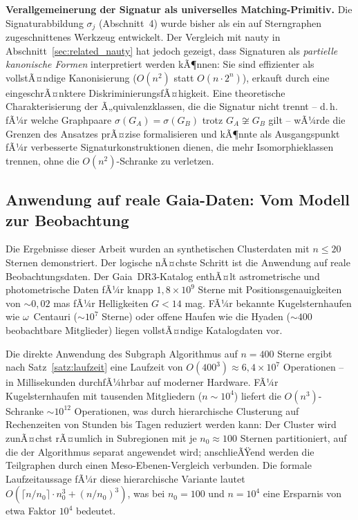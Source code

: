 ﻿\documentclass[a4paper,12pt]{report}
\theoremstyle{definition}
\begin{document}
\textbf{Verallgemeinerung der Signatur als universelles Matching-Primitiv.} Die Signaturabbildung $\sigma_j$ (Abschnitt~4) wurde bisher als ein auf Sterngraphen zugeschnittenes Werkzeug entwickelt. Der Vergleich mit nauty in Abschnitt~\ref{sec:related_nauty} hat jedoch gezeigt, dass Signaturen als \emph{partielle kanonische Formen} interpretiert werden kÃ¶nnen: Sie sind effizienter als vollstÃ¤ndige Kanonisierung ($O(n^2)$ statt $O(n \cdot 2^n)$), erkauft durch eine eingeschrÃ¤nktere DiskriminierungsfÃ¤higkeit. Eine theoretische Charakterisierung der Ã„quivalenzklassen, die die Signatur nicht trennt -- d.\,h. fÃ¼r welche Graphpaare $\sigma(G_A) = \sigma(G_B)$ trotz $G_A \not\cong G_B$ gilt -- wÃ¼rde die Grenzen des Ansatzes prÃ¤zise formalisieren und kÃ¶nnte als Ausgangspunkt fÃ¼r verbesserte Signaturkonstruktionen dienen, die mehr Isomorphieklassen trennen, ohne die $O(n^2)$-Schranke zu verletzen.

\subsection{Anwendung auf reale Gaia-Daten: Vom Modell zur Beobachtung}

Die Ergebnisse dieser Arbeit wurden an synthetischen Clusterdaten mit $n \leq 20$ Sternen demonstriert. Der logische nÃ¤chste Schritt ist die Anwendung auf reale Beobachtungsdaten. Der Gaia~DR3-Katalog \cite{gaia2022} enthÃ¤lt astrometrische und photometrische Daten fÃ¼r knapp $1{,}8 \times 10^9$ Sterne mit Positionsgenauigkeiten von $\sim 0{,}02$ mas fÃ¼r Helligkeiten $G < 14$ mag. FÃ¼r bekannte Kugelsternhaufen wie $\omega$~Centauri ($\sim 10^7$ Sterne) oder offene Haufen wie die Hyaden ($\sim 400$ beobachtbare Mitglieder) liegen vollstÃ¤ndige Katalogdaten vor.

Die direkte Anwendung des Subgraph Algorithmus auf $n = 400$ Sterne ergibt nach Satz~\ref{satz:laufzeit} eine Laufzeit von $O(400^3) \approx 6{,}4 \times 10^7$ Operationen -- in Millisekunden durchfÃ¼hrbar auf moderner Hardware. FÃ¼r Kugelsternhaufen mit tausenden Mitgliedern ($n \sim 10^4$) liefert die $O(n^3)$-Schranke $\sim 10^{12}$ Operationen, was durch hierarchische Clusterung auf Rechenzeiten von Stunden bis Tagen reduziert werden kann: Der Cluster wird zunÃ¤chst rÃ¤umlich in Subregionen mit je $n_0 \approx 100$ Sternen partitioniert, auf die der Algorithmus separat angewendet wird; anschlieÃŸend werden die Teilgraphen durch einen Meso-Ebenen-Vergleich verbunden. Die formale Laufzeitaussage fÃ¼r diese hierarchische Variante lautet $O\!\left(\lceil n / n_0 \rceil \cdot n_0^3 + (n/n_0)^3\right)$, was bei $n_0 = 100$ und $n = 10^4$ eine Ersparnis von etwa Faktor $10^4$ bedeutet.
\end{document}

